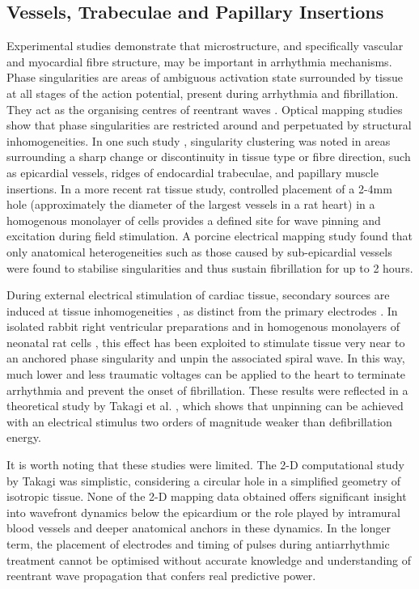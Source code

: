   \subsection{Vessels, Trabeculae and Papillary Insertions} %
  \label{sub:vessels_trabeculae_and_papillary_insertions}
  
    Experimental studies demonstrate that microstructure, and specifically vascular and myocardial fibre structure, may be important in arrhythmia mechanisms. Phase singularities are areas of ambiguous activation state surrounded by tissue at all stages of the action potential, present during arrhythmia and fibrillation. They act as the organising centres of reentrant waves \cite{Gray1998}. Optical mapping studies show that phase singularities are restricted around and perpetuated by structural inhomogeneities. In one such study \cite{Valderrabano2003}, singularity clustering was noted in areas surrounding a sharp change or discontinuity in tissue type or fibre direction, such as epicardial vessels, ridges of endocardial trabeculae, and papillary muscle insertions. In a more recent rat tissue study\cite{Cysyk2008}, controlled placement of a 2-4mm hole (approximately the diameter of the largest vessels in a rat heart) in a homogenous monolayer of cells provides a defined site for wave pinning and excitation during field stimulation. A porcine electrical mapping study \cite{Qin2005} found that only anatomical heterogeneities such as those caused by sub-epicardial vessels were found to stabilise singularities and thus sustain fibrillation for up to 2 hours.

    During external electrical stimulation of cardiac tissue, secondary sources are induced at tissue inhomogeneities \cite{Sobie1997}, as distinct from the primary electrodes \cite{Roth1998}. In isolated rabbit right ventricular preparations \cite{Ripplinger2006} and in homogenous monolayers of neonatal rat cells \cite{Cysyk2008}, this effect has been exploited to stimulate tissue very near to an anchored phase singularity and unpin the associated spiral wave. In this way, much lower and less traumatic voltages can be applied to the heart to terminate arrhythmia and prevent the onset of fibrillation. These results were reflected in a theoretical study by Takagi et al. \cite{Takagi2004}, which shows that unpinning can be achieved with an electrical stimulus two orders of magnitude weaker than defibrillation energy.
    
    It is worth noting that these studies were limited. The 2-D computational study by Takagi \cite{Takagi2004} was simplistic, considering a circular hole in a simplified geometry of isotropic tissue. None of the 2-D mapping data obtained offers significant insight into wavefront dynamics below the epicardium or the role played by intramural blood vessels and deeper anatomical anchors in these dynamics. In the longer term, the placement of electrodes and timing of pulses during antiarrhythmic treatment cannot be optimised without accurate knowledge and understanding of reentrant wave propagation that confers real predictive power.
    

